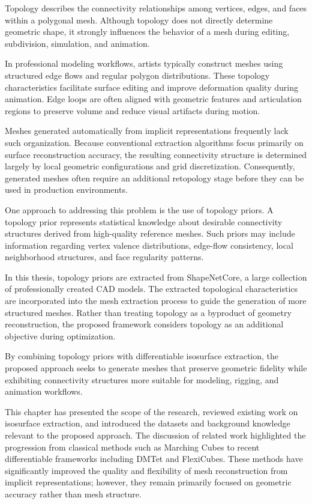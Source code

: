 \documentclass[../main.tex]{subfiles}
\begin{document}
Topology describes the connectivity relationships among vertices, edges, and faces within a polygonal mesh. Although topology does not directly determine geometric shape, it strongly influences the behavior of a mesh during editing, subdivision, simulation, and animation.

In professional modeling workflows, artists typically construct meshes using structured edge flows and regular polygon distributions. These topology characteristics facilitate surface editing and improve deformation quality during animation. Edge loops are often aligned with geometric features and articulation regions to preserve volume and reduce visual artifacts during motion.

Meshes generated automatically from implicit representations frequently lack such organization. Because conventional extraction algorithms focus primarily on surface reconstruction accuracy, the resulting connectivity structure is determined largely by local geometric configurations and grid discretization. Consequently, generated meshes often require an additional retopology stage before they can be used in production environments.

One approach to addressing this problem is the use of topology priors. A topology prior represents statistical knowledge about desirable connectivity structures derived from high-quality reference meshes. Such priors may include information regarding vertex valence distributions, edge-flow consistency, local neighborhood structures, and face regularity patterns.

In this thesis, topology priors are extracted from ShapeNetCore, a large collection of professionally created CAD models. The extracted topological characteristics are incorporated into the mesh extraction process to guide the generation of more structured meshes. Rather than treating topology as a byproduct of geometry reconstruction, the proposed framework considers topology as an additional objective during optimization.

By combining topology priors with differentiable isosurface extraction, the proposed approach seeks to generate meshes that preserve geometric fidelity while exhibiting connectivity structures more suitable for modeling, rigging, and animation workflows.


This chapter has presented the scope of the research, reviewed existing work on isosurface extraction, and introduced the datasets and background knowledge relevant to the proposed approach. The discussion of related work highlighted the progression from classical methods such as Marching Cubes to recent differentiable frameworks including DMTet and FlexiCubes. These methods have significantly improved the quality and flexibility of mesh reconstruction from implicit representations; however, they remain primarily focused on geometric accuracy rather than mesh structure.
\end{document}
